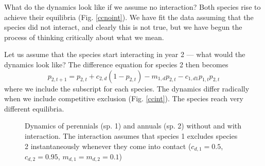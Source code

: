 What do the dynamics look like if we assume no interaction? Both species rise to achieve their equilibria (Fig. \ref{ccnoint}). We have fit the data assuming that the species did not interact, and clearly this is not true, but we have begun the process of thinking critically about what we mean. 

Let us assume that the species start interacting in year 2 --- what would the dynamics look like? The difference equation for species 2 then becomes
\begin{equation}
  \label{eq:ccint2}
    p_{2,t+1}= p_{2,t}  +c_{2,d}(1-p_{2,t})-m_{1,d}p_{2,t} - c_{1,d1}p_{1,t}p_{2,t}
\end{equation}
where we include the subscript for each species. The dynamics differ radically when we include competitive exclusion (Fig. \ref{ccint}). The species reach very different equilibria.
\begin{figure}[ht]
  \centering
  \caption{Dynamics of perennials (sp. 1) and annuals (sp. 2) without
    and with interaction. The interaction assumes that species 1
    excludes species 2 instantaneously whenever they come into contact ($c_{d,1}=0.5$, $c_{d,2} = 0.95$,
$m_{d,1} = m_{d,2}= 0.1$)}
  \label{fig:cc}
\end{figure}

